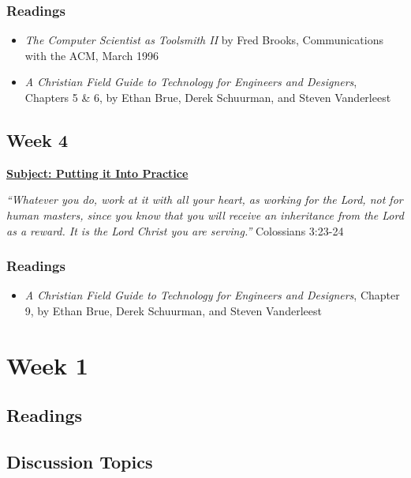 \documentclass[11pt]{article}
\let\oldsection\section
\renewcommand\section{\clearpage\oldsection}
\begin{document}
\subsubsection*{Readings}
\label{sec:orgc2c82e2}
\begin{itemize}
\item \emph{The Computer Scientist as Toolsmith II} by Fred Brooks, Communications with
the ACM, March 1996
\item \emph{A Christian Field Guide to Technology for Engineers and Designers}, Chapters
5 \& 6, by Ethan Brue, Derek Schuurman, and Steven Vanderleest
\end{itemize}
\subsection*{Week 4}
\label{sec:orgf1cbd85}
\textbf{\uline{Subject: Putting it Into Practice}}
\begin{mdframed}
\emph{``Whatever you do, work at it with all your heart, as working for the Lord, not
for human masters, since you know that you will receive an inheritance from the
Lord as a reward. It is the Lord Christ you are serving.''} Colossians 3:23-24
\end{mdframed}
\subsubsection*{Readings}
\label{sec:orgc4611df}
\begin{itemize}
\item \emph{A Christian Field Guide to Technology for Engineers and Designers}, Chapter
9, by Ethan Brue, Derek Schuurman, and Steven Vanderleest
\end{itemize}
\section*{Week 1}
\label{sec:org8fc90e2}
\subsection*{Readings}
\label{sec:org906ebce}
\subsection*{Discussion Topics}
\label{sec:orgb55f989}
\end{document}
